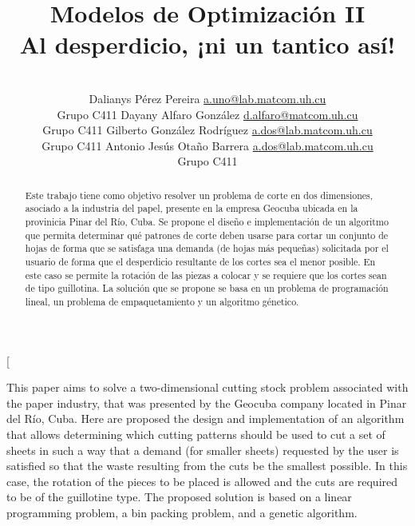 \documentclass[a4paper,10pt,twocolumn]{article}
\title{Modelos de Optimización II \\
	Al desperdicio, ¡ni un tantico así!}
\author{\\
\name Dalianys Pérez Pereira \email \href{mailto:a.uno@lab.matcom.uh.cu}{a.uno@lab.matcom.uh.cu}
	\\ \addr Grupo C411 \AND
\name Dayany Alfaro González \email \href{mailto:d.alfaro@matcom.uh.cu}{d.alfaro@matcom.uh.cu}
  \\ \addr Grupo C411 \AND
\name Gilberto González Rodríguez \email \href{mailto:a.dos@lab.matcom.uh.cu}{a.dos@lab.matcom.uh.cu}
\\ \addr Grupo C411 \AND
\name Antonio Jesús Otaño Barrera \email \href{mailto:a.dos@lab.matcom.uh.cu}{a.dos@lab.matcom.uh.cu}
\\ \addr Grupo C411}
\begin{document}
\twocolumn[

\maketitle


\begin{abstract}

Este trabajo tiene como objetivo resolver un problema de corte en dos dimensiones, asociado a la industria del papel, presente en la empresa Geocuba ubicada en la provinicia Pinar del Río, Cuba. Se propone el  diseño e implementación de un algoritmo que permita determinar qué patrones de corte deben usarse para cortar un conjunto de hojas de forma que se satisfaga una demanda (de hojas más pequeñas) solicitada por el usuario de forma que el desperdicio resultante de los cortes sea el menor posible. En este caso se permite la rotación de las piezas a colocar y se requiere que los cortes sean de tipo guillotina. La solución que se propone se basa en un problema de programación lineal, un problema de empaquetamiento y un algoritmo génetico.

\end{abstract}

\vspace{0.5cm}

\begin{enabstract}

This paper aims to solve a two-dimensional cutting stock problem associated with the paper industry, that was presented by the Geocuba company located in Pinar del Río, Cuba. Here are proposed the design and implementation of an algorithm that allows determining which cutting patterns should be used to cut a set of sheets in such a way that a demand (for smaller sheets) requested by the user is satisfied so that the waste resulting from the cuts be the smallest possible. In this case, the rotation of the pieces to be placed is allowed and the cuts are required to be of the guillotine type. The proposed solution is based on a linear programming problem, a bin packing problem, and a genetic algorithm. 

\end{enabstract}
\end{document}
